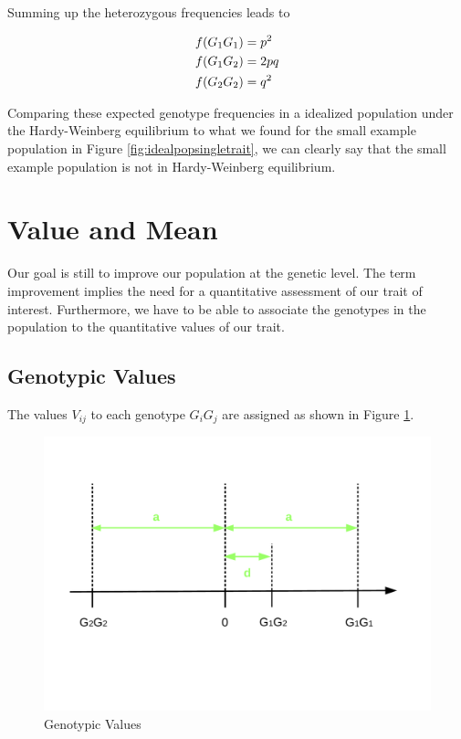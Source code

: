 \documentclass[
]{book}
\theoremstyle{definition}
\theoremstyle{definition}
\theoremstyle{definition}
\theoremstyle{remark}
\begin{document}
Summing up the heterozygous frequencies leads to

\begin{align}
f(G_1G_1) &= p^2 \notag \\
f(G_1G_2) &= 2pq \notag \\
f(G_2G_2) &= q^2
\label{eq:genofreq}
\end{align}

Comparing these expected genotype frequencies in a idealized population under the Hardy-Weinberg equilibrium to what we found for the small example population in Figure \ref{fig:idealpopsingletrait}, we can clearly say that the small example population is not in Hardy-Weinberg equilibrium.

\hypertarget{value-mean}{%
\section{Value and Mean}\label{value-mean}}

Our goal is still to improve our population at the genetic level. The term improvement implies the need for a quantitative assessment of our trait of interest. Furthermore, we have to be able to associate the genotypes in the population to the quantitative values of our trait.

\hypertarget{geno-value}{%
\subsection{Genotypic Values}\label{geno-value}}

The values \(V_{ij}\) to each genotype \(G_iG_j\) are assigned as shown in Figure \ref{fig:genotypicvalue}.

\begin{figure}[!ht]
\includegraphics[width=1\linewidth,]{odg/genotypicvalue} \caption{Genotypic Values}\label{fig:genotypicvalue}
\end{figure}
\end{document}
